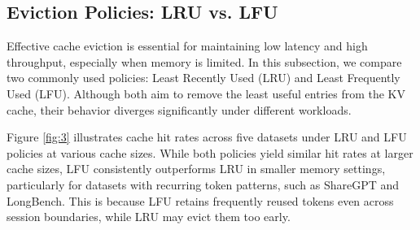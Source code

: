 \documentclass[sigconf,nonacm]{acmart}
\begin{document}
\subsection{Eviction Policies: LRU vs. LFU}
Effective cache eviction is essential for maintaining low latency and high throughput, especially when memory is limited. In this subsection, we compare two commonly used policies: Least Recently Used (LRU) and Least Frequently Used (LFU). Although both aim to remove the least useful entries from the KV cache, their behavior diverges significantly under different workloads.

Figure \ref{fig:3} illustrates cache hit rates across five datasets under LRU and LFU policies at various cache sizes. While both policies yield similar hit rates at larger cache sizes, LFU consistently outperforms LRU in smaller memory settings, particularly for datasets with recurring token patterns, such as ShareGPT and LongBench. This is because LFU retains frequently reused tokens even across session boundaries, while LRU may evict them too early.
\end{document}
